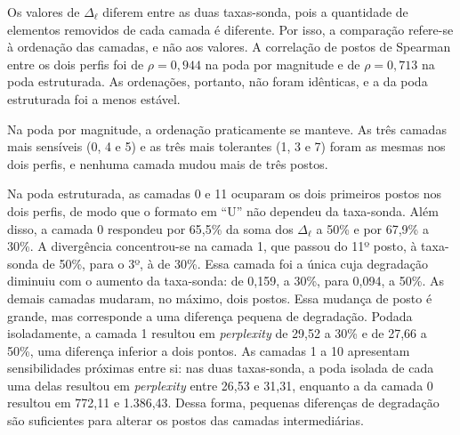 Os valores de $\Delta_{\ell}$ diferem entre as duas taxas-sonda, pois a quantidade de elementos
removidos de cada camada é diferente. Por isso, a comparação refere-se à ordenação das camadas,
e não aos valores. A correlação de postos de Spearman entre os dois perfis foi de $\rho =
0{,}944$ na poda por magnitude e de $\rho = 0{,}713$ na poda estruturada. As ordenações,
portanto, não foram idênticas, e a da poda estruturada foi a menos estável.

Na poda por magnitude, a ordenação praticamente se manteve. As três camadas mais sensíveis (0,
4 e 5) e as três mais tolerantes (1, 3 e 7) foram as mesmas nos dois perfis, e nenhuma camada
mudou mais de três postos.

Na poda estruturada, as camadas 0 e 11 ocuparam os dois primeiros postos nos dois perfis, de
modo que o formato em ``U'' não dependeu da taxa-sonda. Além
disso, a camada 0 respondeu por 65,5\% da soma dos $\Delta_{\ell}$ a 50\% e por 67,9\% a 30\%.
A divergência concentrou-se na camada 1, que passou do 11º posto, à taxa-sonda de 50\%, para o
3º, à de 30\%. Essa camada foi a única cuja degradação diminuiu com o aumento da taxa-sonda: de
0,159, a 30\%, para 0,094, a 50\%. As demais camadas mudaram, no máximo, dois postos. Essa
mudança de posto é grande, mas corresponde a uma diferença pequena de degradação. Podada
isoladamente, a camada 1 resultou em \textit{perplexity} de 29,52 a 30\% e de 27,66 a 50\%, uma
diferença inferior a dois pontos. As camadas 1 a 10 apresentam sensibilidades próximas entre
si: nas duas taxas-sonda, a poda isolada de cada uma delas resultou em \textit{perplexity}
entre 26,53 e 31,31, enquanto a da camada 0 resultou em 772,11 e 1.386,43. Dessa forma,
pequenas diferenças de degradação são suficientes para alterar os postos das camadas
intermediárias.

